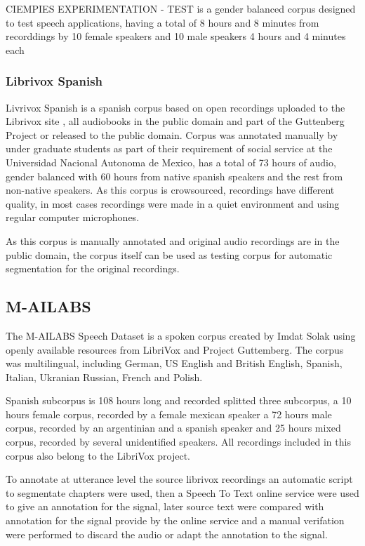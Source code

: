 \documentclass[10pt, a4paper]{article}
\begin{document}
CIEMPIES EXPERIMENTATION - TEST is a gender balanced corpus designed to test speech applications, having a total of 8 hours and 8 minutes from recorddings by 10 female speakers and 10 male speakers 4 hours and 4 minutes each

\subsubsection{Librivox Spanish}

Livrivox Spanish is a spanish corpus based on open recordings uploaded to the Librivox site \cite{LibriVox}, all audiobooks in the public domain and part of the Guttenberg Project \cite{gutenberg} or released to the public domain. Corpus was annotated manually by under graduate students as part of their requirement of social service at the Universidad Nacional Autonoma de Mexico, has a total of 73 hours of audio, gender balanced with 60 hours from native spanish speakers and the rest from non-native speakers. As this corpus is crowsourced, recordings have different quality, in most cases recordings were made in a quiet environment and using regular computer microphones.

As this corpus is manually annotated and original audio recordings are in the public domain, the corpus itself can be used as testing corpus for automatic segmentation for the original recordings.


\subsection{M-AILABS}

The M-AILABS Speech Dataset is a spoken corpus created by Imdat Solak using openly available resources from LibriVox and Project Guttemberg. The corpus was multilingual, including German, US English and British English, Spanish, Italian, Ukranian Russian, French and Polish.

Spanish subcorpus is 108 hours long and recorded splitted three subcorpus, a 10 hours female corpus, recorded by a female mexican speaker a 72 hours male corpus, recorded by an argentinian and a spanish speaker and  25 hours mixed corpus, recorded by several unidentified speakers. All recordings included in this corpus also belong to the LibriVox project.

To annotate at utterance level the source librivox recordings an automatic script to segmentate chapters were used, then a Speech To Text online service were used to give an annotation for the signal, later source text were compared with annotation for the signal provide by the online service and a manual verifation were performed to discard the audio or adapt the annotation to the signal.
\end{document}
